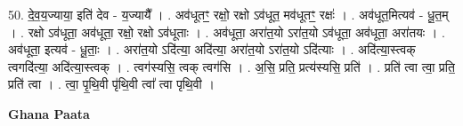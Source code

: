 \documentclass[17pt]{extarticle}
\begin{document}
50. दे॒व॒य॒ज्याया॒ इति॑ देव - य॒ज्यायै᳚ । . अव॑धूतꣳ॒॒ रक्षो॒ रक्षो ऽव॑धूत॒ मव॑धूतꣳ॒॒ रक्षः॑ । . अव॑धूत॒मित्यव॑ - धू॒त॒म् । . रक्षो ऽव॑धूता॒ अव॑धूता॒ रक्षो॒ रक्षो ऽव॑धूताः । . अव॑धूता॒ अरा॑त॒यो ऽरा॑त॒यो ऽव॑धूता॒ अव॑धूता॒ अरा॑तयः । . अव॑धूता॒ इत्यव॑ - धू॒ताः॒ । . अरा॑त॒यो ऽदि॑त्या॒ अदि॑त्या॒ अरा॑त॒यो ऽरा॑त॒यो ऽदि॑त्याः । . अदि॑त्या॒स्त्वक् त्वगदि॑त्या॒ अदि॑त्या॒स्त्वक् । . त्वग॑स्यसि॒ त्वक् त्वग॑सि । . अ॒सि॒ प्रति॒ प्रत्य॑स्यसि॒ प्रति॑ । . प्रति॑ त्वा त्वा॒ प्रति॒ प्रति॑ त्वा । . त्वा॒ पृ॒थि॒वी पृ॑थि॒वी त्वा᳚ त्वा पृथि॒वी । \newline

\textbf{Ghana Paata } \newline
\end{document}
